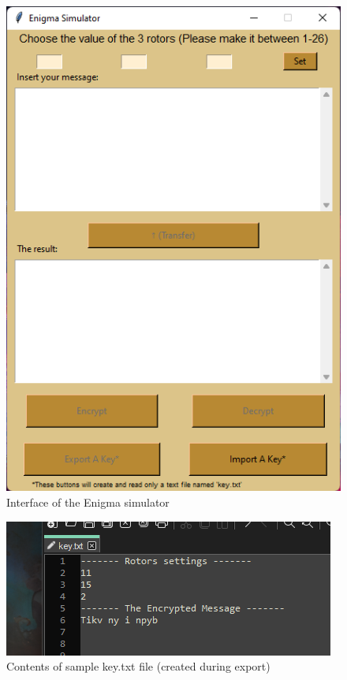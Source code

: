 \documentclass[conference,compsoc]{IEEEtran}
\begin{document}
\begin{figure}[h!]
    \centering
    \includegraphics[scale = 0.8]{interface.png}
    \caption{Interface of the Enigma simulator}
    \label{fig:infac}
\end{figure}
\begin{figure}[h!]
    \centering
    \includegraphics[scale = 0.8]{keysample.png}
    \caption{Contents of sample key.txt file (created during export)}
    \label{fig:sample}
\end{figure}

\end{document}
